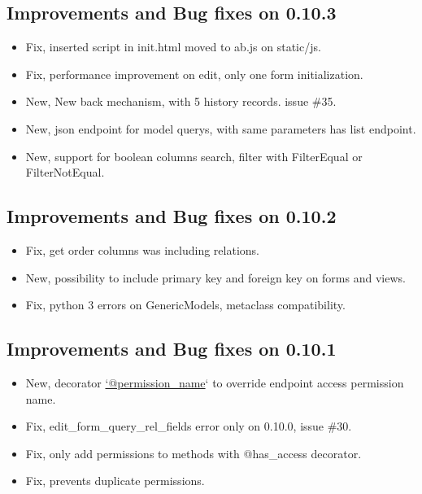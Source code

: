 \documentclass[letterpaper,10pt,english]{sphinxmanual}
\begin{document}
\subsection{Improvements and Bug fixes on 0.10.3}
\label{versions:improvements-and-bug-fixes-on-0-10-3}\begin{itemize}
\item {} 
Fix, inserted script in init.html moved to ab.js on static/js.

\item {} 
Fix, performance improvement on edit, only one form initialization.

\item {} 
New, New back mechanism, with 5 history records. issue \#35.

\item {} 
New, json endpoint for model querys, with same parameters has list endpoint.

\item {} 
New, support for boolean columns search, filter with FilterEqual or FilterNotEqual.

\end{itemize}


\subsection{Improvements and Bug fixes on 0.10.2}
\label{versions:improvements-and-bug-fixes-on-0-10-2}\begin{itemize}
\item {} 
Fix, get order columns was including relations.

\item {} 
New, possibility to include primary key and foreign key on forms and views.

\item {} 
Fix, python 3 errors on GenericModels, metaclass compatibility.

\end{itemize}


\subsection{Improvements and Bug fixes on 0.10.1}
\label{versions:improvements-and-bug-fixes-on-0-10-1}\begin{itemize}
\item {} 
New, decorator \href{mailto:'@permission\_name}{`@permission\_name}` to override endpoint access permission name.

\item {} 
Fix, edit\_form\_query\_rel\_fields error only on 0.10.0, issue \#30.

\item {} 
Fix, only add permissions to methods with @has\_access decorator.

\item {} 
Fix, prevents duplicate permissions.

\end{itemize}
\end{document}
